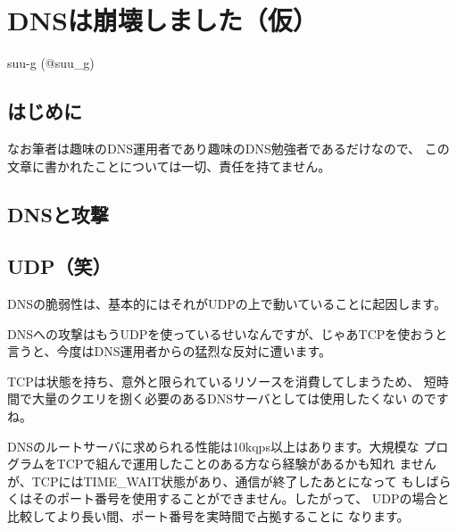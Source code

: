 
\chapter{DNSは崩壊しました（仮）}

\begin{flushright}
 {\headfont suu-g (@suu\_g)}
\end{flushright}

\section{はじめに}


なお筆者は趣味のDNS運用者であり趣味のDNS勉強者であるだけなので、
この文章に書かれたことについては一切、責任を持てません。

\section{DNSと攻撃}


\section{UDP（笑）}
DNSの脆弱性は、基本的にはそれがUDPの上で動いていることに起因します。



DNSへの攻撃はもうUDPを使っているせいなんですが、じゃあTCPを使おうと
言うと、今度はDNS運用者からの猛烈な反対に遭います。

TCPは状態を持ち、意外と限られているリソースを消費してしまうため、
短時間で大量のクエリを捌く必要のあるDNSサーバとしては使用したくない
のですね。

DNSのルートサーバに求められる性能は10kqps以上はあります。大規模な
プログラムをTCPで組んで運用したことのある方なら経験があるかも知れ
ませんが、TCPにはTIME\_WAIT状態があり、通信が終了したあとになって
もしばらくはそのポート番号を使用することができません。したがって、
UDPの場合と比較してより長い間、ポート番号を実時間で占拠することに
なります。

